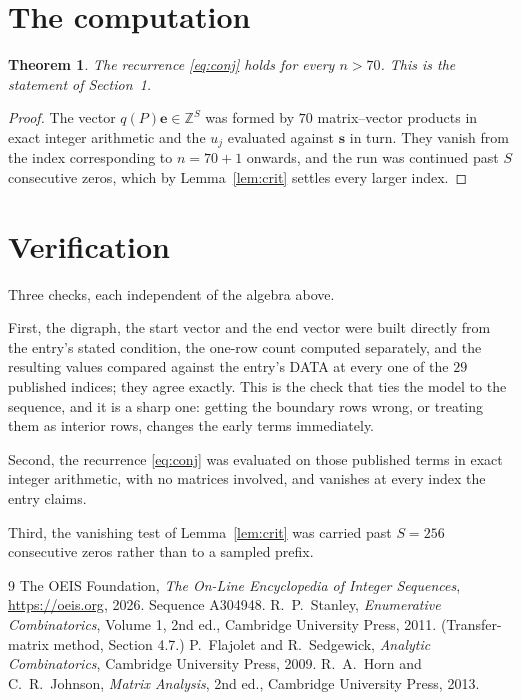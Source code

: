 \documentclass[11pt,a4paper]{article}
\theoremstyle{plain}
\newtheorem{theorem}{Theorem}
\theoremstyle{definition}
\begin{document}
\section{The computation}

\begin{theorem}
The recurrence \eqref{eq:conj} holds for every $n>70$. This is the statement of
Section~1.
\end{theorem}

\begin{proof}
The vector $q(P)\mathbf{e}\in\mathbb{Z}^{S}$ was formed by $70$ matrix--vector
products in exact integer arithmetic and the $u_j$ evaluated against $\mathbf{s}$ in turn.
They vanish from the index corresponding to $n=70+1$ onwards, and the run was continued
past $S$ consecutive zeros, which by Lemma~\ref{lem:crit} settles every larger index.
\end{proof}

\section{Verification}

Three checks, each independent of the algebra above.

First, the digraph, the start vector and the end vector were built directly from the
entry's stated condition, the one-row count computed separately, and the resulting values
compared against the entry's DATA at every one of the $29$ published indices; they
agree exactly. This is the check that ties the model to the sequence, and it is a sharp one:
getting the boundary rows wrong, or treating them as interior rows, changes the early terms
immediately.

Second, the recurrence \eqref{eq:conj} was evaluated on those published terms in exact
integer arithmetic, with no matrices involved, and vanishes at every index the entry claims.

Third, the vanishing test of Lemma~\ref{lem:crit} was carried past $S=256$ consecutive
zeros rather than to a sampled prefix.

\begin{thebibliography}{9}
 The OEIS Foundation, \emph{The On-Line Encyclopedia of Integer
Sequences}, \url{https://oeis.org}, 2026. Sequence A304948.
 R.~P.~Stanley, \emph{Enumerative Combinatorics}, Volume 1, 2nd ed.,
Cambridge University Press, 2011. (Transfer-matrix method, Section 4.7.)
 P.~Flajolet and R.~Sedgewick, \emph{Analytic Combinatorics}, Cambridge
University Press, 2009.
 R.~A.~Horn and C.~R.~Johnson, \emph{Matrix Analysis}, 2nd ed., Cambridge
University Press, 2013.
\end{thebibliography}
\end{document}
